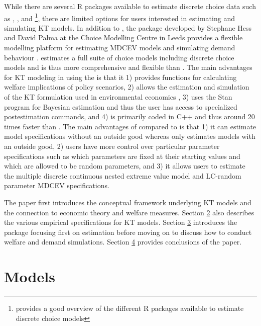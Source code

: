 While there are several R packages available to estimate discrete choice
data such as  \citep{hessapollo2019}, 
\citep{mlogit2019}, and 
\citep{sarriasmultinomial2017}\footnote{\citet{sarriasmultinomial2017}
  provides a good overview of the different R packages available to
  estimate discrete choice models}, there are limited options for users
interested in estimating and simulating KT models. In addition to
, the
\href{http://www.apollochoicemodelling.com/}{} package
developed by Stephane Hess and David Palma at the Choice Modelling
Centre in Leeds provides a flexible modelling platform for estimating
MDCEV models and simulating demand behaviour \citep{hessapollo2019}.
 estimates a full suite of choice models including discrete
choice models and is thus more comprehensive and flexible than
. The main advantages for KT modeling in using the
 is that it 1) provides functions for calculating welfare
implications of policy scenarios, 2) allows the estimation and
simulation of the KT formulation used in environmental economics
\citep{vonhaefenkuhn-tucker2005}, 3) uses the Stan program
\citep{carpenterstan2017} for Bayesian estimation and thus the user has
access to specialized postestimation commands, and 4) is primarily coded
in C++ and thus around 20 times faster than . The main
advantages of  compared to  is that 1) it can
estimate model specifications without an outside good whereas
 only estimates models with an outside good, 2) users have
more control over particular parameter specifications such as which
parameters are fixed at their starting values and which are allowed to
be random parameters, and 3) it allows users to estimate the multiple
discrete continuous nested extreme value model and LC-random parameter
MDCEV specifications.

The paper first introduces the conceptual framework underlying KT models
and the connection to economic theory and welfare measures. Section
\protect\hyperlink{models}{2} also describes the various empirical
specifications for KT models. Section \protect\hyperlink{rmdcev}{3}
introduces the  package focusing first on estimation before
moving on to discuss how to conduct welfare and demand simulations.
Section \protect\hyperlink{conclusions}{4} provides conclusions of the
paper.

\hypertarget{models}{%
\section{Models}\label{models}}

